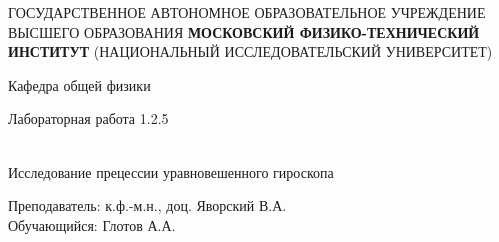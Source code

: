 \documentclass[12pt,a4paper]{article}
\author{Глотов Алексей}
\begin{document}
\newpage
\begin{center}
\footnotesize{{ГОСУДАРСТВЕННОЕ АВТОНОМНОЕ ОБРАЗОВАТЕЛЬНОЕ УЧРЕЖДЕНИЕ}\break
{ВЫСШЕГО ОБРАЗОВАНИЯ}
\break
{\bf {МОСКОВСКИЙ ФИЗИКО-ТЕХНИЧЕСКИЙ ИНСТИТУТ}}
\break
\small{(НАЦИОНАЛЬНЫЙ ИССЛЕДОВАТЕЛЬСКИЙ УНИВЕРСИТЕТ)}}
\break
\hfill \break
\hfill \break
\begin{center}
\normalsize{Кафедра общей физики}
\end{center}
\hfill \break
\hfill \break
\hfill \break
\hfill \break

\begin{center}
\normalsize {Лабораторная работа 1.2.5}
\end{center}
\hfill \break\\
\large{Исследование прецессии уравновешенного гироскопа}
\end{center}
\begin{flushleft}
\hfill \break
\hfill \break
\hfill \break
\hfill \break
\hfill \break
\hfill \break
\hfill \break
\hfill \break
\hfill \break
\hfill \break
\hangindent=9cm
\normalsize{Преподаватель:}\hfill
\normalsize{к.ф.-м.н., доц. Яворский В.А.}\\
\hfill \break
\normalsize{Обучающийся:}\hfill
\normalsize{Глотов А.А.} \\
\hfill \break
\end{flushleft}
\hfill \break
\hfill \break
\hfill \break
\hfill \break
\hfill \break
\hfill \break
\hfill \break
\hfill \break
\hfill \break
\hfill \break
\hfill \break
\end{document}

